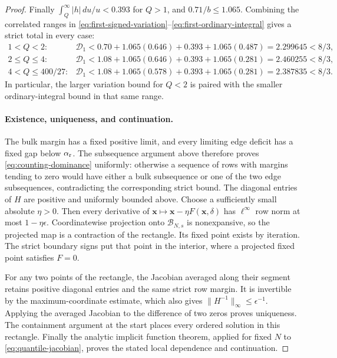 \begin{proof}
Finally \(\int_Q^\infty |h|\,du/u<0.393\) for \(Q>1\), and
\(0.71/b\le1.065\). Combining the correlated ranges in
\eqref{eq:first-signed-variation}--\eqref{eq:first-ordinary-integral} gives a strict total in every case:
\[
 \begin{array}{ll}
 1<Q<2:
 &\mathcal D_1
 <0.70+1.065(0.646)+0.393+1.065(0.487)
 =2.299645<8/3,\\[2mm]
 2\le Q\le4:
 &\mathcal D_1
 <1.08+1.065(0.646)+0.393+1.065(0.281)
 =2.460255<8/3,\\[2mm]
 4<Q\le400/27:
 &\mathcal D_1
 <1.08+1.065(0.578)+0.393+1.065(0.281)
 =2.387835<8/3.
 \end{array}
\]
In particular, the larger variation bound for \(Q<2\) is paired with the smaller ordinary-integral bound in that same range.

\paragraph{Existence, uniqueness, and continuation.}
The bulk margin has a fixed positive limit, and every limiting edge deficit has a fixed gap below \(\alpha_{\rm r}\). The subsequence argument above therefore proves \eqref{eq:counting-dominance} uniformly: otherwise a sequence of rows with margins tending to zero would have either a bulk subsequence or one of the two edge subsequences, contradicting the corresponding strict bound. The diagonal entries of \(H\) are positive and uniformly bounded above. Choose a sufficiently small absolute \(\eta>0\). Then every derivative of
\(\boldsymbol x\mapsto\boldsymbol x-\eta F(\boldsymbol x,\delta)\) has
\(\ell^\infty\) row norm at most \(1-\eta\epsilon\). Coordinatewise projection onto \(\mathcal B_{N,s}\) is nonexpansive, so the projected map is a contraction of the rectangle. Its fixed point exists by iteration. The strict boundary signs put that point in the interior, where a projected fixed point satisfies \(F=0\).

For any two points of the rectangle, the Jacobian averaged along their segment retains positive diagonal entries and the same strict row margin. It is invertible by the maximum-coordinate estimate, which also gives
\(\|H^{-1}\|_\infty\le\epsilon^{-1}\). Applying the averaged Jacobian to the difference of two zeros proves uniqueness. The containment argument at the start places every ordered solution in this rectangle. Finally the analytic implicit function theorem, applied for fixed \(N\) to \eqref{eq:quantile-jacobian}, proves the stated local dependence and continuation.
\end{proof}
